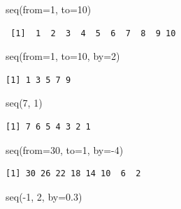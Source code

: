 \documentclass[
  letterpaper,
  DIV=11,
  numbers=noendperiod]{scrreprt}
\newenvironment{Shaded}{\begin{snugshade}}{\end{snugshade}}
\newcommand{\AttributeTok}[1]{\textcolor[rgb]{0.40,0.45,0.13}{#1}}
\newcommand{\DecValTok}[1]{\textcolor[rgb]{0.68,0.00,0.00}{#1}}
\newcommand{\FloatTok}[1]{\textcolor[rgb]{0.68,0.00,0.00}{#1}}
\newcommand{\FunctionTok}[1]{\textcolor[rgb]{0.28,0.35,0.67}{#1}}
\newcommand{\NormalTok}[1]{\textcolor[rgb]{0.00,0.23,0.31}{#1}}
\newcommand{\SpecialCharTok}[1]{\textcolor[rgb]{0.37,0.37,0.37}{#1}}
\begin{document}
\begin{Shaded}
\begin{Highlighting}[]
\FunctionTok{seq}\NormalTok{(}\AttributeTok{from=}\DecValTok{1}\NormalTok{, }\AttributeTok{to=}\DecValTok{10}\NormalTok{)}
\end{Highlighting}
\end{Shaded}

\begin{verbatim}
 [1]  1  2  3  4  5  6  7  8  9 10
\end{verbatim}

\begin{Shaded}
\begin{Highlighting}[]
\FunctionTok{seq}\NormalTok{(}\AttributeTok{from=}\DecValTok{1}\NormalTok{, }\AttributeTok{to=}\DecValTok{10}\NormalTok{, }\AttributeTok{by=}\DecValTok{2}\NormalTok{)}
\end{Highlighting}
\end{Shaded}

\begin{verbatim}
[1] 1 3 5 7 9
\end{verbatim}

\begin{Shaded}
\begin{Highlighting}[]
\FunctionTok{seq}\NormalTok{(}\DecValTok{7}\NormalTok{, }\DecValTok{1}\NormalTok{)}
\end{Highlighting}
\end{Shaded}

\begin{verbatim}
[1] 7 6 5 4 3 2 1
\end{verbatim}

\begin{Shaded}
\begin{Highlighting}[]
\FunctionTok{seq}\NormalTok{(}\AttributeTok{from=}\DecValTok{30}\NormalTok{, }\AttributeTok{to=}\DecValTok{1}\NormalTok{, }\AttributeTok{by=}\SpecialCharTok{{-}}\DecValTok{4}\NormalTok{)}
\end{Highlighting}
\end{Shaded}

\begin{verbatim}
[1] 30 26 22 18 14 10  6  2
\end{verbatim}

\begin{Shaded}
\begin{Highlighting}[]
\FunctionTok{seq}\NormalTok{(}\SpecialCharTok{{-}}\DecValTok{1}\NormalTok{, }\DecValTok{2}\NormalTok{, }\AttributeTok{by=}\FloatTok{0.3}\NormalTok{)}
\end{Highlighting}
\end{Shaded}
\end{document}
